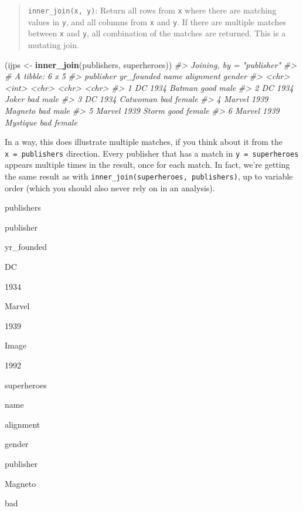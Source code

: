 \documentclass[
]{book}
\newenvironment{Shaded}{\begin{snugshade}}{\end{snugshade}}
\newcommand{\CommentTok}[1]{\textcolor[rgb]{0.56,0.35,0.01}{\textit{#1}}}
\newcommand{\KeywordTok}[1]{\textcolor[rgb]{0.13,0.29,0.53}{\textbf{#1}}}
\newcommand{\NormalTok}[1]{#1}
\newcommand{\StringTok}[1]{\textcolor[rgb]{0.31,0.60,0.02}{#1}}
\begin{document}
\begin{quote}
\texttt{inner\_join(x,\ y)}: Return all rows from \texttt{x} where there are matching values in \texttt{y}, and all columns from \texttt{x} and \texttt{y}. If there are multiple matches between \texttt{x} and \texttt{y}, all combination of the matches are returned. This is a mutating join.
\end{quote}

\begin{Shaded}
\begin{Highlighting}[]
\NormalTok{(ijps <-}\StringTok{ }\KeywordTok{inner_join}\NormalTok{(publishers, superheroes))}
\CommentTok{#> Joining, by = "publisher"}
\CommentTok{#> # A tibble: 6 x 5}
\CommentTok{#>   publisher yr_founded name     alignment gender}
\CommentTok{#>   <chr>          <int> <chr>    <chr>     <chr> }
\CommentTok{#> 1 DC              1934 Batman   good      male  }
\CommentTok{#> 2 DC              1934 Joker    bad       male  }
\CommentTok{#> 3 DC              1934 Catwoman bad       female}
\CommentTok{#> 4 Marvel          1939 Magneto  bad       male  }
\CommentTok{#> 5 Marvel          1939 Storm    good      female}
\CommentTok{#> 6 Marvel          1939 Mystique bad       female}
\end{Highlighting}
\end{Shaded}

In a way, this does illustrate multiple matches, if you think about it from the \texttt{x\ =\ publishers} direction. Every publisher that has a match in \texttt{y\ =\ superheroes} appears multiple times in the result, once for each match. In fact, we're getting the same result as with \texttt{inner\_join(superheroes,\ publishers)}, up to variable order (which you should also never rely on in an analysis).

publishers

publisher

yr\_founded

DC

1934

Marvel

1939

Image

1992

superheroes

name

alignment

gender

publisher

Magneto

bad
\end{document}
